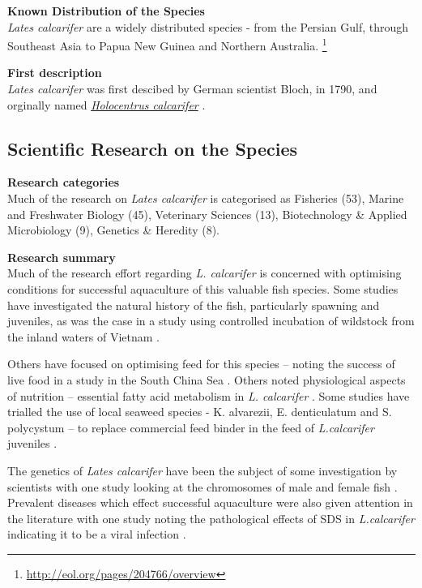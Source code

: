 \documentclass[]{book}
\theoremstyle{definition}
\theoremstyle{definition}
\theoremstyle{definition}
\theoremstyle{remark}
\begin{document}
\textbf{Known Distribution of the Species}\\
\emph{Lates calcarifer} are a widely distributed species - from the
Persian Gulf, through Southeast Asia to Papua New Guinea and Northern
Australia. \footnote{\url{http://eol.org/pages/204766/overview}}

\textbf{First description}\\
\emph{Lates calcarifer} was first descibed by German scientist Bloch, in
1790, and orginally named
\href{https://www.gbif.org/species/2393172}{\emph{Holocentrus
calcarifer}} .

\hypertarget{scientific-research-on-the-species}{%
\subsection{Scientific Research on the
Species}\label{scientific-research-on-the-species}}

\textbf{Research categories}\\
Much of the research on \emph{Lates calcarifer} is categorised as
Fisheries (53), Marine and Freshwater Biology (45), Veterinary Sciences
(13), Biotechnology \& Applied Microbiology (9), Genetics \& Heredity
(8).

\textbf{Research summary}\\
Much of the research effort regarding \emph{L. calcarifer} is concerned
with optimising conditions for successful aquaculture of this valuable
fish species. Some studies have investigated the natural history of the
fish, particularly spawning and juveniles, as was the case in a study
using controlled incubation of wildstock from the inland waters of
Vietnam \citep{Shadrin_2015}.

Others have focused on optimising feed for this species -- noting the
success of live food in a study in the South China Sea
\citep{Shansudin_1997}. Others noted physiological aspects of nutrition
-- essential fatty acid metabolism in \emph{L. calcarifer}
\citep{Mohd_Yusof_2010}. Some studies have trialled the use of local
seaweed species - K. alvarezii, E. denticulatum and S. polycystum -- to
replace commercial feed binder in the feed of \emph{L.calcarifer}
juveniles \citep{Shapawi_2015}.

The genetics of \emph{Lates calcarifer} have been the subject of some
investigation by scientists with one study looking at the chromosomes of
male and female fish \citep{Phimphan_2015}. Prevalent diseases which
effect successful aquaculture were also given attention in the
literature with one study noting the pathological effects of SDS in
\emph{L.calcarifer} indicating it to be a viral infection
\citep{Gibson_Kueh_2011}.
\end{document}
